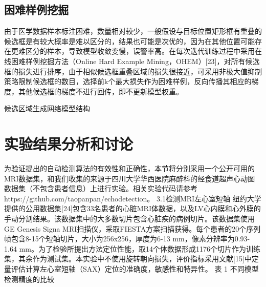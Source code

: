 \subsection{困难样例挖掘}
由于医学数据样本标注困难，数量相对较少，一般假设与目标位置矩形框有重叠的候选框是有较大概率是难以区分的，结果也可能是次优的，因为在其他位置可能存在更难区分的样本，导致模型收敛变慢，误警率高。在每次迭代训练过程中采用在线困难样例挖掘方法（Online Hard Example Mining，OHEM）[23]，对所有候选框的损失进行排序，由于相似候选框重叠区域的损失很接近，可采用非极大值抑制策略限制候选框的数目，选择前k个最大损失作为困难样例，反向传播其相应的梯度，其他候选框的梯度不进行回传，即不更新模型权重。 

 
候选区域生成网络模型结构 
 
 
\section{实验结果分析和讨论}
 
为验证提出的自动检测算法的有效性和正确性，本节将分别采用一个公开可用的MRI数据集，和我们收集的来源于四川大学华西医院麻醉科的经食道超声心动图数据集（不包含患者信息）上进行实验。相关实验代码请参考https://github.com/taopanpan/echodetection。
3.1检测MRI左心室短轴
纽约大学提供的公用数据集[24]包含33名患者的心脏MRI体数据，以及LV心内膜和心外膜的手动分割结果。该数据集中的大多数切片包含心脏疾的病例切片。该数据集使用 GE Genesis Signa MRI扫描仪，采取FIESTA方案扫描获得。每个患者的20个序列帧包含8-15个短轴切片，大小为256x256，厚度为6-13 mm，像素分辨率为0.93-1.64 mm。为了检验所提出方法定位性能，取14个体数据形成1176个切片作为训练集，其余作为测试集。本实验中不使用旋转朝向损失，评价指标采用文献[15]中定量评估计算左心室短轴（SAX）定位的准确度，敏感性和特异性。
表 1 不同模型检测精度的比较


